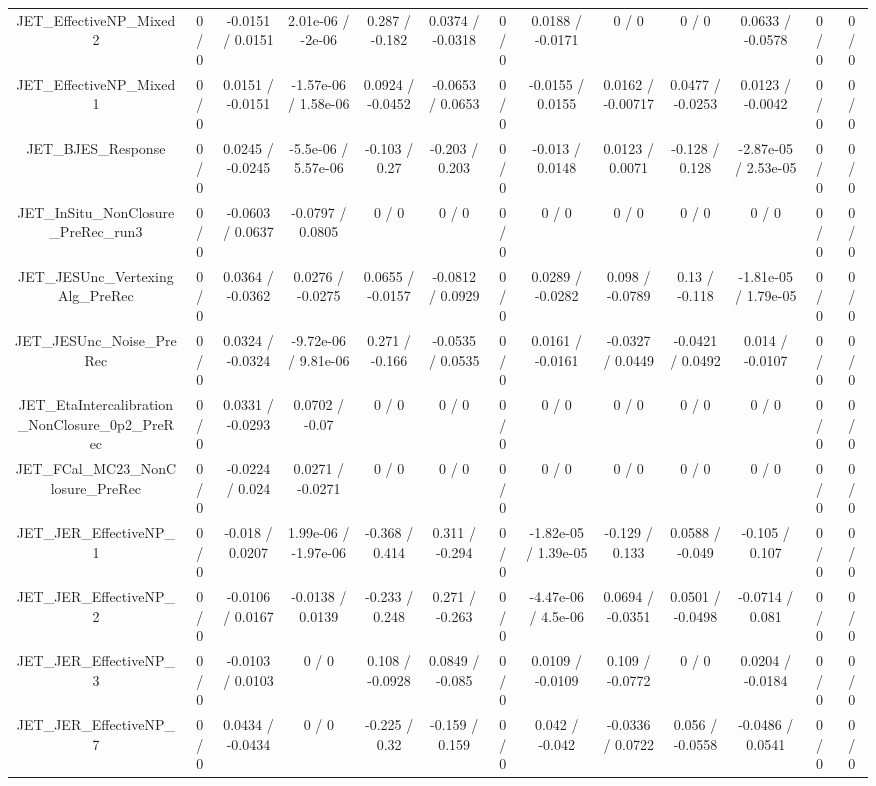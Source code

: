 \documentclass[10pt]{article}
\begin{document}
\begin{table}[htbp]
\begin{center}
\begin{tabular}{|c|c|c|c|c|c|c|c|c|c|c|c|c|}
  JET_EffectiveNP_Mixed2 & 0 / 0 & -0.0151 / 0.0151 & 2.01e-06 / -2e-06 & 0.287 / -0.182 & 0.0374 / -0.0318 & 0 / 0 & 0.0188 / -0.0171 & 0 / 0 & 0 / 0 & 0.0633 / -0.0578 & 0 / 0 & 0 / 0 \\ 
  JET_EffectiveNP_Mixed1 & 0 / 0 & 0.0151 / -0.0151 & -1.57e-06 / 1.58e-06 & 0.0924 / -0.0452 & -0.0653 / 0.0653 & 0 / 0 & -0.0155 / 0.0155 & 0.0162 / -0.00717 & 0.0477 / -0.0253 & 0.0123 / -0.0042 & 0 / 0 & 0 / 0 \\ 
  JET_BJES_Response & 0 / 0 & 0.0245 / -0.0245 & -5.5e-06 / 5.57e-06 & -0.103 / 0.27 & -0.203 / 0.203 & 0 / 0 & -0.013 / 0.0148 & 0.0123 / 0.0071 & -0.128 / 0.128 & -2.87e-05 / 2.53e-05 & 0 / 0 & 0 / 0 \\ 
  JET_InSitu_NonClosure_PreRec_run3 & 0 / 0 & -0.0603 / 0.0637 & -0.0797 / 0.0805 & 0 / 0 & 0 / 0 & 0 / 0 & 0 / 0 & 0 / 0 & 0 / 0 & 0 / 0 & 0 / 0 & 0 / 0 \\ 
  JET_JESUnc_VertexingAlg_PreRec & 0 / 0 & 0.0364 / -0.0362 & 0.0276 / -0.0275 & 0.0655 / -0.0157 & -0.0812 / 0.0929 & 0 / 0 & 0.0289 / -0.0282 & 0.098 / -0.0789 & 0.13 / -0.118 & -1.81e-05 / 1.79e-05 & 0 / 0 & 0 / 0 \\ 
  JET_JESUnc_Noise_PreRec & 0 / 0 & 0.0324 / -0.0324 & -9.72e-06 / 9.81e-06 & 0.271 / -0.166 & -0.0535 / 0.0535 & 0 / 0 & 0.0161 / -0.0161 & -0.0327 / 0.0449 & -0.0421 / 0.0492 & 0.014 / -0.0107 & 0 / 0 & 0 / 0 \\ 
  JET_EtaIntercalibration_NonClosure_0p2_PreRec & 0 / 0 & 0.0331 / -0.0293 & 0.0702 / -0.07 & 0 / 0 & 0 / 0 & 0 / 0 & 0 / 0 & 0 / 0 & 0 / 0 & 0 / 0 & 0 / 0 & 0 / 0 \\ 
  JET_FCal_MC23_NonClosure_PreRec & 0 / 0 & -0.0224 / 0.024 & 0.0271 / -0.0271 & 0 / 0 & 0 / 0 & 0 / 0 & 0 / 0 & 0 / 0 & 0 / 0 & 0 / 0 & 0 / 0 & 0 / 0 \\ 
  JET_JER_EffectiveNP_1 & 0 / 0 & -0.018 / 0.0207 & 1.99e-06 / -1.97e-06 & -0.368 / 0.414 & 0.311 / -0.294 & 0 / 0 & -1.82e-05 / 1.39e-05 & -0.129 / 0.133 & 0.0588 / -0.049 & -0.105 / 0.107 & 0 / 0 & 0 / 0 \\ 
  JET_JER_EffectiveNP_2 & 0 / 0 & -0.0106 / 0.0167 & -0.0138 / 0.0139 & -0.233 / 0.248 & 0.271 / -0.263 & 0 / 0 & -4.47e-06 / 4.5e-06 & 0.0694 / -0.0351 & 0.0501 / -0.0498 & -0.0714 / 0.081 & 0 / 0 & 0 / 0 \\ 
  JET_JER_EffectiveNP_3 & 0 / 0 & -0.0103 / 0.0103 & 0 / 0 & 0.108 / -0.0928 & 0.0849 / -0.085 & 0 / 0 & 0.0109 / -0.0109 & 0.109 / -0.0772 & 0 / 0 & 0.0204 / -0.0184 & 0 / 0 & 0 / 0 \\ 
  JET_JER_EffectiveNP_7 & 0 / 0 & 0.0434 / -0.0434 & 0 / 0 & -0.225 / 0.32 & -0.159 / 0.159 & 0 / 0 & 0.042 / -0.042 & -0.0336 / 0.0722 & 0.056 / -0.0558 & -0.0486 / 0.0541 & 0 / 0 & 0 / 0 \\ 

\end{tabular}
\end{center}
\end{table}
\end{document}
